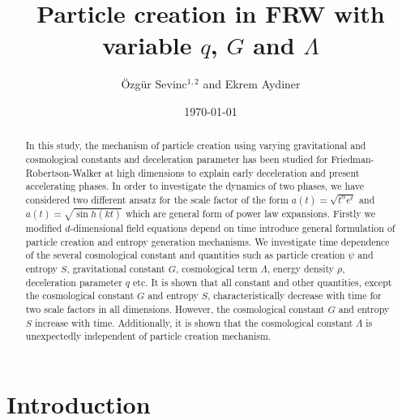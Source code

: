 \documentclass[superscriptaddress,showpacs,pre,twocolumn]{revtex4-1}
\begin{document}

\title{Particle creation in FRW with variable $q$,  $G$ and $\Lambda$}

\author{Özgür Sevinc$^{1,2}$ and Ekrem Aydiner} 



\date{\today}%

\begin{abstract} %
In this study, the mechanism of particle creation using varying gravitational and cosmological constants and deceleration parameter has been studied for Friedman-Robertson-Walker at high dimensions to explain early deceleration and present accelerating phases. In order to investigate the dynamics of two phases, we have considered two different ansatz for the scale factor of the form  $a(t)=\sqrt{t^{\alpha}e^{t}}$ and $a(t)=\sqrt{\sin h(kt)}$ which are general form of power law expansions. Firstly we modified $d$-dimensional field equations depend on time introduce general formulation of particle creation and entropy generation mechanisms. We investigate time dependence of the several cosmological constant and quantities such as particle creation $\psi$ and entropy $S$, gravitational constant $G$, cosmological term $\Lambda$, energy density $\rho$, deceleration parameter $q$ etc. It is shown that all constant and other quantities, except the cosmological constant $G$ and entropy $S$, characteristically decrease with time for two scale factors in all dimensions. However, the cosmological constant $G$ and entropy $S$ increase with time. Additionally, it is shown that the cosmological constant $\Lambda$ is unexpectedly independent of particle creation mechanism.

\end{abstract}

\maketitle

\section{Introduction}
\end{document}

